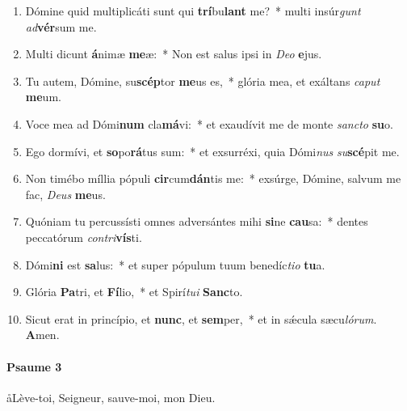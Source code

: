 \documentclass[twoside]{article}
\begin{document}
\begin{paracol}[1]{2}
\begin{enumerate}[wide, itemsep=0mm, labelwidth=!, labelindent=0pt, label=\color{gregoriocolor}\theenumi]
\item Dómine quid multiplicáti sunt qui \textbf{trí}bu\textbf{lant} me?~* multi insúr\textit{gunt} \textit{ad}\textbf{vér}sum me.
\item Multi dicunt \textbf{á}nimæ \textbf{me}æ:~* Non est salus ipsi in \textit{De}\textit{o} \textbf{e}jus.
\item Tu autem, Dómine, su\textbf{scép}tor \textbf{me}us es,~* glória mea, et exáltans \textit{ca}\textit{put} \textbf{me}um.
\item Voce mea ad Dómi\textbf{num} cla\textbf{má}vi:~* et exaudívit me de monte \textit{sanc}\textit{to} \textbf{su}o.
\item Ego dormívi, et \textbf{so}po\textbf{rá}tus sum:~* et exsurréxi, quia Dómi\textit{nus} \textit{su}\textbf{scé}pit me.
\item Non timébo míllia pópuli \textbf{cir}cum\textbf{dán}tis me:~* exsúrge, Dómine, salvum me fac, \textit{De}\textit{us} \textbf{me}us.
\item Quóniam tu percussísti omnes adversántes mihi \textbf{si}ne \textbf{cau}sa:~* dentes peccatórum \textit{con}\textit{tri}\textbf{vís}ti.
\item Dómi\textbf{ni} est \textbf{sa}lus:~* et super pópulum tuum benedíc\textit{ti}\textit{o} \textbf{tu}a.
\item Glória \textbf{Pa}tri, et \textbf{Fí}lio,~* et Spirí\textit{tu}\textit{i} \textbf{Sanc}to.
\item Sicut erat in princípio, et \textbf{nunc}, et \textbf{sem}per,~* et in sǽcula sæcu\textit{ló}\textit{rum}. \textbf{A}men.
\end{enumerate}

\switchcolumn
\newpage
\paragraph{Psaume 3}
\aa Lève-toi, Seigneur, sauve-moi, mon Dieu.



\end{paracol}
\end{document}
